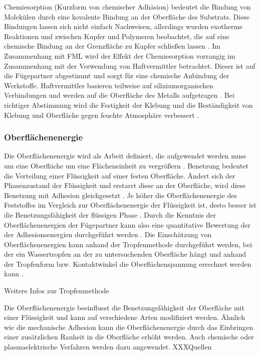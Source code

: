Chemiesorption (Kurzform von chemischer Adhäsion) bedeutet die Bindung von Molekülen durch eine kovalente Bindung an der Oberfläche des Substrats. Diese Bindungen lassen sich nicht einfach Nachweisen, allerdings wurden exotherme Reaktionen und zwischen Kupfer und Polymeren beobachtet, die auf eine chemische Bindung an der Grenzfläche zu Kupfer schließen lassen \cite{Schroer.1994}.
Im Zusammenhang mit FML wird der Effekt der Chemiesorption vorrangig im Zusammenhang mit der Verwendung von Haftvermittler betrachtet. Dieser ist auf die Fügepartner abgestimmt und sorgt für eine chemische Anbindung der Werkstoffe. Haftvermittler basieren teilweise auf siliziumorganischen Verbindungen und werden auf die Oberfläche des Metalls aufgetragen \cite{Zucchi.2006}. Bei richtiger Abstimmung wird die Festigkeit der Klebung und die Beständigkeit von Klebung und Oberfläche gegen feuchte Atmosphäre verbessert \cite{Habenicht.2009}. 

\subsubsection{Oberflächenenergie}\label{sec:Eoberfläche}

Die Oberflächenenergie wird als Arbeit definiert, die aufgewendet werden muss um eine Oberfläche um eine Flächeneinheit zu vergrößern \cite{Flock.2012}. Benetzung bedeutet die Verteilung einer Flüssigkeit auf einer festen Oberfläche. Ändert sich der Phasenzustand der Flüssigkeit und erstarrt diese an der Oberfläche, wird diese Benetzung mit Adhesion gleichgesetzt \cite{Habenicht.2009}.
Je höher die Oberflächenenergie des Feststoffes im Vergleich zur Oberflächenenergie der Flüssigkeit ist, desto besser ist die Benetzungsfähigkeit der flüssigen Phase \cite{Flock.2012}.
Durch die Kenntnis der Oberflächenenergien der Fügepartner kann also eine quantitative Bewertung der der Adhesionsenergien durchgeführt werden \cite{Nikolova.2005}. Die Einschätzung von Oberflächenenergien kann anhand der Tropfenmethode durchgeführt werden, bei der ein Wassertropfen an der zu untersuchenden Oberfläche hängt und anhand der Tropfenform bzw. Kontaktwinkel die Oberflächenspannung errechnet werden kann \cite{Flock.2012}.

Weitere Infos zur Tropfenmethode

Die Oberflächenenergie beeinflusst die Benetzungsfähigkeit der Oberfläche mit einer Flüssigkeit und kann auf verschiedene Arten modifiziert werden. Ähnlich wie die mechanische Adhesion kann die Oberflächenenergie durch das Einbringen einer zusätzlichen Rauheit in die Oberfläche erhöht werden. Auch chemische oder plasmaelektrische Verfahren werden dazu angewendet. XXXQuellen

